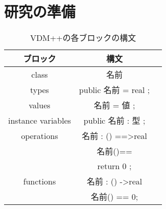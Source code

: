\chapter{研究の準備}\label{cha:Preparation}

\begin{table}[t]
    \begin{center}      
        \caption{VDM++の各ブロックの構文}\label{vdm_syntax}
        \begin{tabular}{c|c|c}
        ブロック  & 構文　\\ \hline \hline
        class & 名前 \\ \hline
        types	 & public 名前 = real ;\\ \hline
        values  & 名前 = 値 ;\\ \hline
        instance variables & public 名前 : 型 ;\\ \hline
        operations & 名前 : () ==\textgreater real\\
                   & 名前()==\\
                   & return 0 ;\\ \hline 
        functions  & 名前 : () -\textgreater real \\
                   & 名前() == 0; \\ \hline 
        \end{tabular}
    \end{center}
\end{table}
